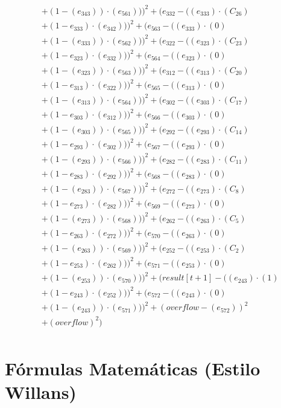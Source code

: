 \documentclass[10pt, a4paper]{article}
\begin{document}
\begin{small}
\begin{align*}
& + (1 - (e_{343})) \cdot (e_{561})))^{2} + (e_{332} - ((e_{333})  \cdot  (C_{26}) \\
& + (1 - e_{333})  \cdot  (e_{342})))^{2} + (e_{563} - ((e_{333}) \cdot (0) \\
& + (1 - (e_{333})) \cdot (e_{562})))^{2} + (e_{322} - ((e_{323})  \cdot  (C_{23}) \\
& + (1 - e_{323})  \cdot  (e_{332})))^{2} + (e_{564} - ((e_{323}) \cdot (0) \\
& + (1 - (e_{323})) \cdot (e_{563})))^{2} + (e_{312} - ((e_{313})  \cdot  (C_{20}) \\
& + (1 - e_{313})  \cdot  (e_{322})))^{2} + (e_{565} - ((e_{313}) \cdot (0) \\
& + (1 - (e_{313})) \cdot (e_{564})))^{2} + (e_{302} - ((e_{303})  \cdot  (C_{17}) \\
& + (1 - e_{303})  \cdot  (e_{312})))^{2} + (e_{566} - ((e_{303}) \cdot (0) \\
& + (1 - (e_{303})) \cdot (e_{565})))^{2} + (e_{292} - ((e_{293})  \cdot  (C_{14}) \\
& + (1 - e_{293})  \cdot  (e_{302})))^{2} + (e_{567} - ((e_{293}) \cdot (0) \\
& + (1 - (e_{293})) \cdot (e_{566})))^{2} + (e_{282} - ((e_{283})  \cdot  (C_{11}) \\
& + (1 - e_{283})  \cdot  (e_{292})))^{2} + (e_{568} - ((e_{283}) \cdot (0) \\
& + (1 - (e_{283})) \cdot (e_{567})))^{2} + (e_{272} - ((e_{273})  \cdot  (C_{8}) \\
& + (1 - e_{273})  \cdot  (e_{282})))^{2} + (e_{569} - ((e_{273}) \cdot (0) \\
& + (1 - (e_{273})) \cdot (e_{568})))^{2} + (e_{262} - ((e_{263})  \cdot  (C_{5}) \\
& + (1 - e_{263})  \cdot  (e_{272})))^{2} + (e_{570} - ((e_{263}) \cdot (0) \\
& + (1 - (e_{263})) \cdot (e_{569})))^{2} + (e_{252} - ((e_{253})  \cdot  (C_{2}) \\
& + (1 - e_{253})  \cdot  (e_{262})))^{2} + (e_{571} - ((e_{253}) \cdot (0) \\
& + (1 - (e_{253})) \cdot (e_{570})))^{2} + (result[t+1] - ((e_{243})  \cdot  (1) \\
& + (1 - e_{243})  \cdot  (e_{252})))^{2} + (e_{572} - ((e_{243}) \cdot (0) \\
& + (1 - (e_{243})) \cdot (e_{571})))^{2} + (overflow - (e_{572}))^{2} \\
& + (overflow)^{2}) \\
\end{align*}
\end{small}\part{Fórmulas Matemáticas (Estilo Willans)}
\end{document}
